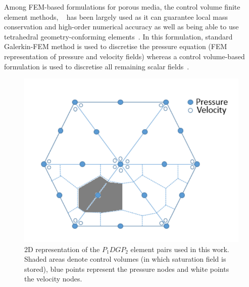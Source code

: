 \documentclass[preprint,authoryear,12pt]{elsarticle}
\begin{document}
\medskip
Among FEM-based formulations for porous media, the control volume finite element methods, ~\citep[CVFEM,][]{fung_1992} has been largely used as it can guarantee local mass conservation and high-order numerical accuracy as well as being able to use tetrahedral geometry-conforming elements~\citep{forsyth_1990, geiger_2004, hurtado_2007}. In this formulation, standard Galerkin-FEM method is used to discretise the pressure equation (FEM representation of pressure and velocity fields) whereas a control volume-based formulation is used to discretise all remaining scalar fields~\citep[e.g., saturation, density, species concentration etc, see][]{gomes_book_2012}. 

\begin{figure}[h]
\centering
\includegraphics[width=.5\textwidth]{./Pics/P1DGP2.pdf}
\caption{2D representation of the $P_{1}DGP_{2}$ element pairs used in this work. Shaded areas denote control volumes (in which saturation field is stored), blue points represent the pressure nodes and white points the velocity nodes.}
\label{fig:fem_cv}
\end{figure}
\end{document}
